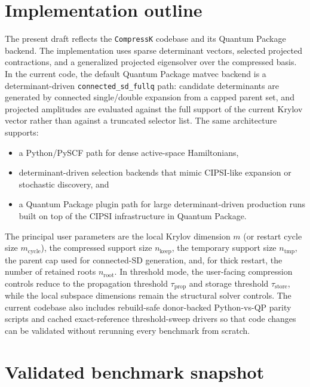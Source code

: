 \documentclass[aip,jcp,preprint,longbibliography]{revtex4-2}
\begin{document}
\section{Implementation outline}
The present draft reflects the \texttt{CompressK} codebase and its Quantum Package backend. The implementation uses sparse determinant vectors, selected projected contractions, and a generalized projected eigensolver over the compressed basis. In the current code, the default Quantum Package matvec backend is a determinant-driven \texttt{connected\_sd\_fullq} path: candidate determinants are generated by connected single/double expansion from a capped parent set, and projected amplitudes are evaluated against the full support of the current Krylov vector rather than against a truncated selector list. The same architecture supports:
\begin{itemize}
  \item a Python/PySCF path for dense active-space Hamiltonians,
  \item determinant-driven selection backends that mimic CIPSI-like expansion or stochastic discovery, and
  \item a Quantum Package plugin path for large determinant-driven production runs built on top of the CIPSI infrastructure in Quantum Package.\cite{garniron2019qp2}
\end{itemize}

The principal user parameters are the local Krylov dimension $m$ (or restart cycle size $m_{\mathrm{cycle}}$), the compressed support size $n_{\mathrm{keep}}$, the temporary support size $n_{\mathrm{tmp}}$, the parent cap used for connected-SD generation, and, for thick restart, the number of retained roots $n_{\mathrm{root}}$. In threshold mode, the user-facing compression controls reduce to the propagation threshold $\tau_{\mathrm{prop}}$ and storage threshold $\tau_{\mathrm{store}}$, while the local subspace dimensions remain the structural solver controls. The current codebase also includes rebuild-safe donor-backed Python-vs-QP parity scripts and cached exact-reference threshold-sweep drivers so that code changes can be validated without rerunning every benchmark from scratch.

\section{Validated benchmark snapshot}
\end{document}

